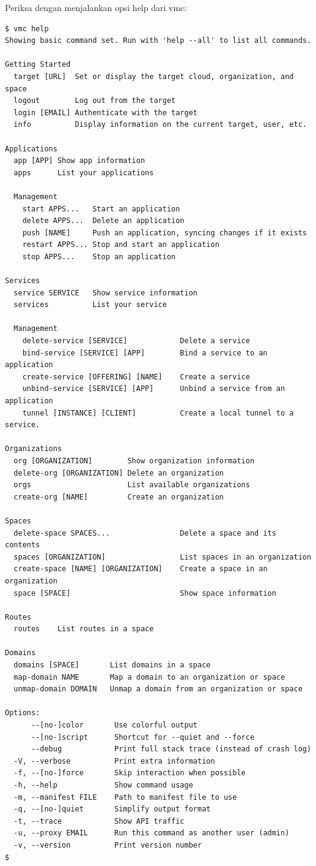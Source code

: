Periksa dengan menjalankan opsi help dari vmc:

\lstset{language=bash,caption=Hasil opsi help dari vmc}
\begin{lstlisting}
$ vmc help 
Showing basic command set. Run with 'help --all' to list all commands.

Getting Started
  target [URL] 	Set or display the target cloud, organization, and space
  logout       	Log out from the target
  login [EMAIL]	Authenticate with the target
  info         	Display information on the current target, user, etc.

Applications
  app [APP]	Show app information
  apps     	List your applications

  Management
    start APPS...  	Start an application
    delete APPS... 	Delete an application
    push [NAME]    	Push an application, syncing changes if it exists
    restart APPS...	Stop and start an application
    stop APPS...   	Stop an application

Services
  service SERVICE	Show service information
  services       	List your service

  Management
    delete-service [SERVICE]        	Delete a service
    bind-service [SERVICE] [APP]    	Bind a service to an application
    create-service [OFFERING] [NAME]	Create a service
    unbind-service [SERVICE] [APP]  	Unbind a service from an application
    tunnel [INSTANCE] [CLIENT]      	Create a local tunnel to a service.

Organizations
  org [ORGANIZATION]       	Show organization information
  delete-org [ORGANIZATION]	Delete an organization
  orgs                     	List available organizations
  create-org [NAME]        	Create an organization

Spaces
  delete-space SPACES...            	Delete a space and its contents
  spaces [ORGANIZATION]             	List spaces in an organization
  create-space [NAME] [ORGANIZATION]	Create a space in an organization
  space [SPACE]                     	Show space information

Routes
  routes	List routes in a space

Domains
  domains [SPACE]    	List domains in a space
  map-domain NAME    	Map a domain to an organization or space
  unmap-domain DOMAIN	Unmap a domain from an organization or space

Options:
      --[no-]color       Use colorful output
      --[no-]script      Shortcut for --quiet and --force
      --debug            Print full stack trace (instead of crash log)
  -V, --verbose          Print extra information
  -f, --[no-]force       Skip interaction when possible
  -h, --help             Show command usage
  -m, --manifest FILE    Path to manifest file to use
  -q, --[no-]quiet       Simplify output format
  -t, --trace            Show API traffic
  -u, --proxy EMAIL      Run this command as another user (admin)
  -v, --version          Print version number
$ 
\end{lstlisting}

